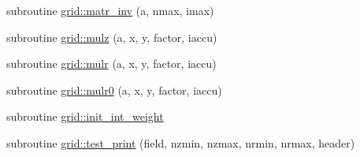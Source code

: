 \begin{DoxyCompactItemize}
\item 
subroutine \hyperlink{namespacegrid_a3fa4b3b24e221d4f98dc90fc2bc54c21}{grid\+::matr\+\_\+inv} (a, nmax, imax)
\item 
subroutine \hyperlink{namespacegrid_a094af63a3600c9b47d99fc5eb2b0b28c}{grid\+::mulz} (a, x, y, factor, iaccu)
\item 
subroutine \hyperlink{namespacegrid_a729ef173ecbf5623d1bf2c94fcc0bf92}{grid\+::mulr} (a, x, y, factor, iaccu)
\item 
subroutine \hyperlink{namespacegrid_aa66349c5be01c56fead6f21b56fda0a2}{grid\+::mulr0} (a, x, y, factor, iaccu)
\item 
subroutine \hyperlink{namespacegrid_a8424de604ef58a42851aa63b52bf535f}{grid\+::init\+\_\+int\+\_\+weight}
\item 
subroutine \hyperlink{namespacegrid_ad009f2e6c140cc067f8aa8f9ffac21b2}{grid\+::test\+\_\+print} (field, nzmin, nzmax, nrmin, nrmax, header)
\end{DoxyCompactItemize}

